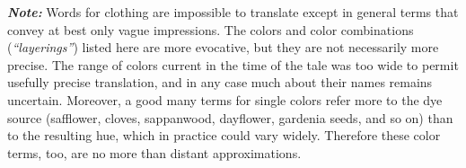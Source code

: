 \documentclass{article}
\begin{document}
\clearpage




\begin{small}
\noindent \textbf{\textit{Note:}} Words for clothing are impossible to translate except in general terms that convey at best only vague impressions. The colors and color combinations (\textit{``layerings''}) listed here are more evocative, but they are not necessarily more precise. The range of colors current in the time of the tale was too wide to permit usefully precise translation, and in any case much about their names remains uncertain. Moreover, a good many terms for single colors refer more to the dye source (safflower, cloves, sappanwood, dayflower, gardenia seeds, and so on) than to the resulting hue, which in practice could vary widely. Therefore these color terms, too, are no more than distant approximations.
\end{small}
\vspace{-0.75em}


\end{document}
